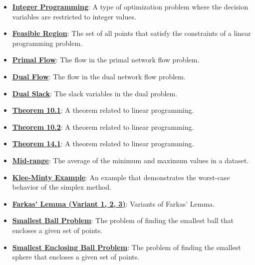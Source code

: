 \documentclass{article}%
\begin{document}
\begin{itemize}[leftmargin=*]
\item \href{https://www.math.purdue.edu/~yipn/421/2024-11-14-NetAppls.pdf#page=7}{\textbf{Integer Programming}}: A type of optimization problem where the decision variables are restricted to integer values.%
\item \href{https://www.math.purdue.edu/~yipn/421/2024-11-14-NetAppls.pdf#page=7}{\textbf{Feasible Region}}: The set of all points that satisfy the constraints of a linear programming problem.%
\item \href{https://www.math.purdue.edu/~yipn/421/2024-11-14-NetAppls.pdf#page=7}{\textbf{Primal Flow}}: The flow in the primal network flow problem.%
\item \href{https://www.math.purdue.edu/~yipn/421/2024-11-14-NetAppls.pdf#page=7}{\textbf{Dual Flow}}: The flow in the dual network flow problem.%
\item \href{https://www.math.purdue.edu/~yipn/421/2024-11-14-NetAppls.pdf#page=7}{\textbf{Dual Slack}}: The slack variables in the dual problem.%
\item \href{https://www.math.purdue.edu/~yipn/421/2024-11-14-NetAppls.pdf#page=7}{\textbf{Theorem 10.1}}: A theorem related to linear programming.%
\item \href{https://www.math.purdue.edu/~yipn/421/2024-11-14-NetAppls.pdf#page=7}{\textbf{Theorem 10.2}}: A theorem related to linear programming.%
\item \href{https://www.math.purdue.edu/~yipn/421/2024-11-14-NetAppls.pdf#page=7}{\textbf{Theorem 14.1}}: A theorem related to linear programming.%
\item \href{https://www.math.purdue.edu/~yipn/421/2024-11-14-NetAppls.pdf#page=7}{\textbf{Mid{-}range}}: The average of the minimum and maximum values in a dataset.%
\item \href{https://www.math.purdue.edu/~yipn/421/2024-11-14-NetAppls.pdf#page=7}{\textbf{Klee{-}Minty Example}}: An example that demonstrates the worst-case behavior of the simplex method.%
\item \href{https://www.math.purdue.edu/~yipn/421/2024-11-14-NetAppls.pdf#page=7}{\textbf{Farkas' Lemma (Variant 1, 2, 3)}}: Variants of Farkas' Lemma.%
\item \href{https://www.math.purdue.edu/~yipn/421/2024-11-14-NetAppls.pdf#page=7}{\textbf{Smallest Ball Problem}}: The problem of finding the smallest ball that encloses a given set of points.%
\item \href{https://www.math.purdue.edu/~yipn/421/2024-11-14-NetAppls.pdf#page=7}{\textbf{Smallest Enclosing Ball Problem}}: The problem of finding the smallest sphere that encloses a given set of points.%

\end{itemize}
\end{document}
